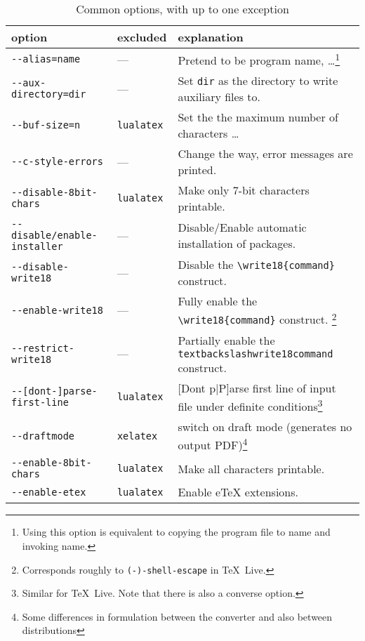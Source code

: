 \documentclass{article}
\newcommand{\lualatex}{\texttt{lualatex}}
\newcommand{\xelatex}{\texttt{xelatex}}
\newcommand{\texlive}{\TeX~Live}
\begin{document}
\begin{longtable}{|lll|}
  \toprule
  option & excluded & explanation \\
  \midrule
  \midrule
  \endfirsthead%
  \bottomrule
  \caption{\label{tab:latexOptionsCommonMiktex} Common options, with up to one exception }
  \endlastfoot%
  \texttt{-{}-alias=name}            & ---         & Pretend to be program name, \dots\footnote%
{Using this option is equivalent to copying the program file to name and invoking name.} \\
\texttt{-{}-aux-directory=dir}       & ---         & 
Set \texttt{dir} as the directory to write auxiliary files to. \\
\texttt{-{}-buf-size=n}              & \lualatex{} & Set the the maximum number of characters \dots \\
\texttt{-{}-c-style-errors}          & ---         & Change the way, error messages are printed. \\
\texttt{-{}-disable-8bit-chars}      & \lualatex{} & Make only 7-bit characters printable. \\
\texttt{-{}-disable/enable-installer} & ---         & Disable/Enable automatic installation of packages. \\
\texttt{-{}-disable-write18}         & ---         & Disable the \texttt{\textbackslash{}write18\{command\}} construct.\\
\texttt{-{}-enable-write18}          & ---         & Fully enable the \texttt{\textbackslash{}write18\{command\}} construct. \footnote%
{Corresponds roughly to \texttt{(-)-shell-escape} in \texlive. } \\
\texttt{-{}-restrict-write18}        & ---         & Partially enable the \texttt{textbackslash{}write18{command}} construct. \\
\texttt{-{}-[dont-]parse-first-line}        & \lualatex{} & [Dont p|P]arse first line of input file under definite conditions\footnote%
{Similar for \texlive. Note that there is also a converse option. } \\
\texttt{-{}-draftmode}               & \xelatex{}  & switch on draft mode (generates no output PDF)\footnote%
{Some differences in formulation between the converter and also between distributions} \\
\texttt{-{}-enable-8bit-chars}       & \lualatex{} & Make all characters printable. \\
\texttt{-{}-enable-etex}             & \lualatex{} & Enable eTeX extensions. \\

\end{longtable}
\end{document}
